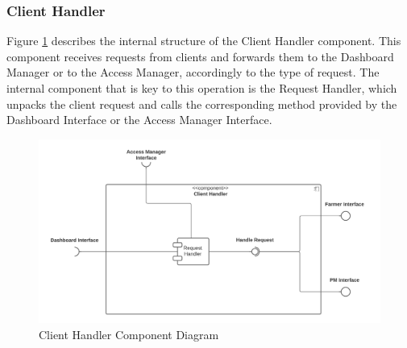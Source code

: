 \documentclass[10pt]{article} %
\begin{document}
\subsubsection{Client Handler}
Figure \ref{fig:client_handler} describes the internal structure of the Client Handler component. This component receives requests from clients and forwards them to the 
Dashboard Manager or to the Access Manager, accordingly to the type of request. The internal component that is key to this operation is the Request Handler, which unpacks the client request 
and calls the corresponding method provided by the Dashboard Interface or the Access Manager Interface. 
\begin{figure}[h]
    \centering 
    \includegraphics[scale=0.42]{images/clientHandler.png}
    \caption{Client Handler Component Diagram}
    \label{fig:client_handler}
\end{figure}
\newpage
\end{document}
